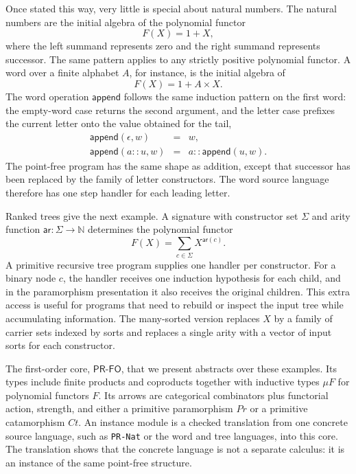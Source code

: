 \documentclass[sigplan,10pt,anonymous,review,screen]{acmart}
\newcommand{\PRFO}{\ensuremath{\mathsf{PR\mbox{-}FO}}}
\newcommand{\AgdaFile}[1]{\texttt{#1}}
\begin{document}
Once stated this way, very little is special about natural numbers.
The natural numbers are the initial algebra of the polynomial functor
\[
  F(X) = 1 + X,
\]
where the left summand represents zero and the right summand represents
successor.  The same pattern applies to any strictly positive polynomial
functor.  A word over a finite alphabet \(A\), for instance,
is the initial algebra of
\[
  F(X) = 1 + A \times X.
\]
The word operation \(\mathsf{append}\) follows the same induction
pattern on the first word: the empty-word case returns the second
argument, and the letter case prefixes the current letter onto the value
obtained for the tail,
\[
  \begin{array}{rcl}
  \mathsf{append}(\epsilon,w) &=& w,\\
  \mathsf{append}(a :: u,w) &=& a :: \mathsf{append}(u,w).
  \end{array}
\]
The point-free program has the same shape as addition, except that
successor has been replaced by the family of letter constructors.  The
word source language therefore has one step handler for each leading
letter.

Ranked trees give the next example.  A signature with constructor set
\(\Sigma\) and arity function
\(\mathsf{ar} : \Sigma \to \mathbb{N}\) determines the polynomial functor
\[
  F(X) = \sum_{c \in \Sigma} X^{\mathsf{ar}(c)}.
\]
A primitive recursive tree program supplies one handler per constructor.
For a binary node \(c\), the handler receives one induction hypothesis
for each child, and in the paramorphism presentation it also receives
the original children.  This extra access is useful for programs that
need to rebuild or inspect the input tree while accumulating information.
The many-sorted version replaces \(X\) by a family of carrier sets
indexed by sorts and replaces a single arity with a vector of input sorts
for each constructor.

The first-order core, \PRFO{}, that we present abstracts over these
examples.  Its types 
include finite products and coproducts together with inductive types
\(\mu F\) for polynomial functors \(F\).  Its arrows are categorical
combinators plus functorial action, strength, and either a primitive
paramorphism \(Pr\) or a primitive catamorphism \(Ct\).  An instance module is a
checked translation from one concrete source language, such as
\AgdaFile{PR-Nat} or the word and tree languages, into this core.  The
translation shows that the concrete language is not a separate calculus:
it is an instance of the same point-free structure.
\end{document}
